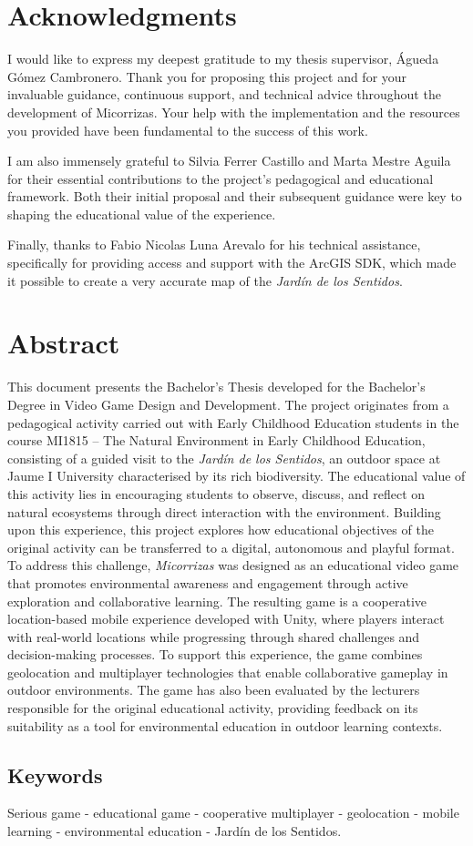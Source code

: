 
\chapter*{Acknowledgments}
I would like to express my deepest gratitude to my thesis supervisor, Águeda Gómez Cambronero. Thank you for proposing this project and for your invaluable guidance, continuous support, and technical advice throughout the development of Micorrizas. Your help with the implementation and the resources you provided have been fundamental to the success of this work.

I am also immensely grateful to Silvia Ferrer Castillo and Marta Mestre Aguila for their essential contributions to the project’s pedagogical and educational framework. Both their initial proposal and their subsequent guidance were key to shaping the educational value of the experience.

Finally, thanks to Fabio Nicolas Luna Arevalo for his technical assistance, specifically for providing access and support with the ArcGIS SDK, which made it possible to create a very accurate map of the \textit{Jardín de los Sentidos}.

\clearpage

\chapter*{Abstract}
This document presents the Bachelor’s Thesis developed for the Bachelor’s Degree in Video Game Design and Development. The project originates from a pedagogical activity carried out with Early Childhood Education students in the course MI1815 – The Natural Environment in Early Childhood Education, consisting of a guided visit to the \textit{Jardín de los Sentidos}, an outdoor space at Jaume I University characterised by its rich biodiversity. The educational value of this activity lies in encouraging students to observe, discuss, and reflect on natural ecosystems through direct interaction with the environment.
Building upon this experience, this project explores how educational objectives of the original activity can be transferred to a digital, autonomous and playful format. To address this challenge, \textit{Micorrizas} was designed as an educational video game that promotes environmental awareness and engagement through active exploration and collaborative learning.
The resulting game is a cooperative location-based mobile experience developed with Unity, where players interact with real-world locations while progressing through shared challenges and decision-making processes. To support this experience, the game combines geolocation and multiplayer technologies that enable collaborative gameplay in outdoor environments. The game has also been evaluated by the lecturers responsible for the original educational activity, providing feedback on its suitability as a tool for environmental education in outdoor learning contexts.

\vspace{1cm}
\section*{Keywords}
Serious game - educational game - cooperative multiplayer - geolocation - mobile learning - environmental education - Jardín de los Sentidos.

\clearpage

\tableofcontents
\clearpage

\listoffigures
\clearpage

\listoftables
\clearpage

